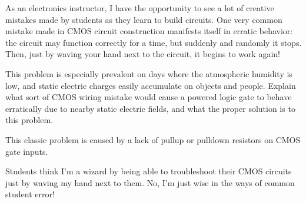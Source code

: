 

As an electronics instructor, I have the opportunity to see a lot of creative mistakes made by students as they learn to build circuits.  One very common mistake made in CMOS circuit construction manifests itself in erratic behavior: the circuit may function correctly for a time, but suddenly and randomly it stops.  Then, just by waving your hand next to the circuit, it begins to work again!

This problem is especially prevalent on days where the atmospheric humidity is low, and static electric charges easily accumulate on objects and people.  Explain what sort of CMOS wiring mistake would cause a powered logic gate to behave erratically due to nearby static electric fields, and what the proper solution is to this problem.







This classic problem is caused by a lack of pullup or pulldown resistors on CMOS gate inputs.







Students think I'm a wizard by being able to troubleshoot their CMOS circuits just by waving my hand next to them.  No, I'm just wise in the ways of common student error!




